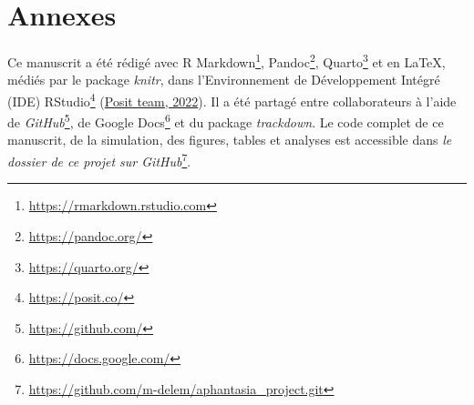 \documentclass[
  12pt,
]{article}
\DeclareRobustCommand{\href}[2]{#2\footnote{\url{#1}}}
\begin{document}
\newpage

\hypertarget{annexes}{%
\section*{Annexes}\label{annexes}}

Ce manuscrit a été rédigé avec \href{https://rmarkdown.rstudio.com}{R
Markdown}, \href{https://pandoc.org/}{Pandoc},
\href{https://quarto.org/}{Quarto} et en \LaTeX, médiés par le package
\emph{knitr}, dans l'Environnement de Développement Intégré (IDE)
\href{https://posit.co/}{RStudio}
(\protect\hyperlink{ref-positteamRStudioIntegratedDevelopment2022}{Posit
team, 2022}). Il a été partagé entre collaborateurs à l'aide de
\href{https://github.com/}{\emph{GitHub}}, de
\href{https://docs.google.com/}{Google Docs} et du package
\emph{trackdown}. Le code complet de ce manuscrit, de la simulation, des
figures, tables et analyses est accessible dans
\href{https://github.com/m-delem/aphantasia_project.git}{\emph{le
dossier de ce projet sur GitHub}}.
\end{document}
